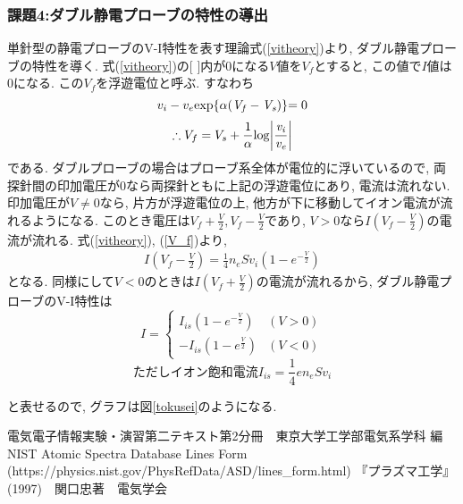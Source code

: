 \documentclass[]{jsarticle}
\begin{document}
		\subsubsection{課題4:ダブル静電プローブの特性の導出}
		単針型の静電プローブのV-I特性を表す理論式(\ref{vitheory})より, ダブル静電プローブの特性を導く. 
		式(\ref{vitheory})の[ ]内が0になる$V$値を$V_f$とすると, この値で$I$値は0になる. この$V_f$を浮遊電位と呼ぶ. すなわち
			$$v_i - v_e \rm{exp} \{\it{\alpha(V_f - V_s)}\} \rm{= 0} $$
			\begin{eqnarray}
				\therefore
				\label{V_f}
				V_f = V_s + \frac{1}{\alpha} \rm{log} \it{ \left| \frac{v_i}{v_e} \right| }
			\end{eqnarray}
	である\cite{plasma}. 
		ダブルプローブの場合はプローブ系全体が電位的に浮いているので, 両探針間の印加電圧が0なら両探針ともに上記の浮遊電位にあり, 電流は流れない. 印加電圧が$V \neq 0$なら, 片方が浮遊電位の上, 他方が下に移動してイオン電流が流れるようになる. このとき電圧は$V_f + \frac{V}{2}, V_f - \frac{V}{2}$であり, $V > 0$なら$I\left(V_f - \frac{V}{2}\right)$の電流が流れる. 式(\ref{vitheory}), (\ref{V_f})より, 
			\begin{eqnarray*}
				I\left(V_f - \frac{V}{2}\right) = \frac{1}{4}n_e S v_i (1 - e^{-\frac{V}{2}})
			\end{eqnarray*}
となる. 同様にして$V < 0$のときは$I\left(V_f + \frac{V}{2}\right)$の電流が流れるから, ダブル静電プローブのV-I特性は
			\[
 			 I = \begin{cases}
   					I_{is} (1 - e^{-\frac{V}{2}})  & (V > 0) \\
   					-I_{is} (1 - e^{\frac{V}{2}}) & (V < 0)
 				 \end{cases}
			\]
			$$ただしイオン飽和電流 I_{is} = \frac{1}{4} e n_e S v_i$$
			
と表せるので, グラフは図\ref{tokusei}のようになる. 


\begin{thebibliography}{9}
 電気電子情報実験・演習第二テキスト第2分冊　東京大学工学部電気系学科 編
 NIST Atomic Spectra Database Lines Form (https://physics.nist.gov/PhysRefData/ASD/lines\_form.html)
『プラズマ工学』(1997)　関口忠著　電気学会
\end{thebibliography}
\end{document}

